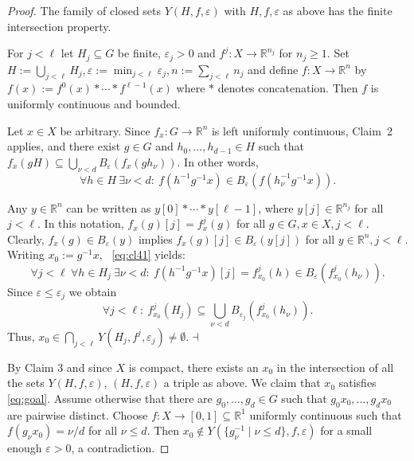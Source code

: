 \documentclass[12pt]{amsart}
\theoremstyle{plain}
\theoremstyle{definition}
\begin{document}
\begin{proof}
\medskip

 The family of closed sets $Y(H,f,\varepsilon)$ with $H,f,\varepsilon$ as above has the finite intersection property.\medskip

For $j<\ell$ let $H_j\subseteq G$ be finite, $\varepsilon_j>0$ and $f^j:X\to \mathbb R^{n_j}$ for $n_j\ge 1$.
Set $H:=\bigcup_{j<\ell}H_j,\varepsilon:=\min_{j<\ell}\varepsilon_j, n:=\sum_{j<\ell}n_j$ and
define $f:X\to\mathbb R^n$ by $f(x):=f^0(x)*\cdots *f^{\ell-1}(x)$ where $*$ denotes concatenation. Then $f$ is uniformly continuous and bounded.

Let $x\in X$ be arbitrary. Since $f_x:G\to\mathbb R^n$ is left uniformly continuous, Claim~2 applies, and there exist
$g\in G$ and $h_0,\ldots,h_{d-1}\in H$ such that
$f_x(gH)\subseteq \bigcup_{\nu<d}B_{\varepsilon}(f_x(gh_\nu))$. In other words,
\begin{equation}\label{eq:cl41}
\forall h\in H\ \exists \nu<d:\ f(h^{-1}g^{-1}x)\in B_{\varepsilon}(f(h_\nu^{-1}g^{-1}x)).
\end{equation}

Any $y\in \mathbb R^n$ can be written as $y[0]*\cdots *y[\ell-1]$, where $y[j]\in\mathbb R^{n_j}$ for all 
$j<\ell$. In this notation, $f_x(g)[j]=f^j_x(g)$ for all $g\in G,x\in X, j<\ell$.
Clearly, $f_x(g)\in B_\varepsilon(y)$ implies $f_x(g)[j]\in B_\varepsilon(y[j])$ for all $y\in \mathbb R^n, j<\ell$.
Writing $x_0:=g^{-1}x$, ~\eqref{eq:cl41} yields: 
\begin{equation*}
\forall j<\ell\ \forall h\in H_j\ \exists \nu<d:\ f(h^{-1}g^{-1}x)[j]=f^j_{x_0}(h)\in B_{\varepsilon}(f^j_{x_0}(h_\nu)).
\end{equation*}
Since $\varepsilon\le \varepsilon_j$ we obtain
$$\textstyle
\forall j<\ell:\ f^j_{x_0}(H_j)\subseteq\bigcup_{\nu<d}B_{\varepsilon_j}(f^j_{x_0}(h_\nu)).
$$
Thus,  $x_0\in \bigcap_{j<\ell}Y(H_j,f^j,\varepsilon_j)\neq\emptyset$.\hfill$\dashv$\medskip

By Claim 3 and since $X$ is compact, there exists an $x_0$ in the intersection of all the sets $Y(H,f,\varepsilon)$, 
$(H,f,\varepsilon)$ a triple as above. We claim that $x_0$ satisfies \eqref{eq:goal}.
Assume otherwise that there  are $g_0,\ldots,g_{d}\in G$ such that $g_0x_0,\ldots,g_{d}x_0$ are pairwise distinct. Choose 
 $f:X\to[0,1]\subseteq \mathbb R^1$ uniformly continuous such that $f(g_\nu x_0)=\nu/d$ for all 
$\nu\le d$. 
Then $x_0\notin Y(\{g^{-1}_\nu\mid \nu\le d\}, f,\varepsilon)$ for a small enough $\varepsilon>0$, a contradiction.\end{proof}
\end{document}
